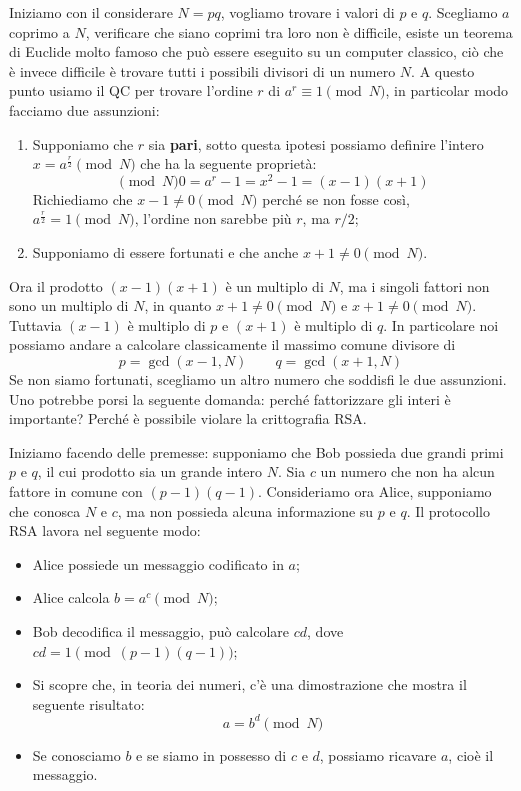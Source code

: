 \noindent Iniziamo con il considerare $N=pq$, vogliamo trovare i valori di $p$ e $q$. Scegliamo $a$ coprimo a $N$, verificare che siano coprimi tra loro non è difficile, esiste un teorema di Euclide molto famoso che può essere eseguito su un computer classico, ciò che è invece difficile è trovare tutti i possibili divisori di un numero $N$. A questo punto usiamo il QC per trovare l'ordine $r$ di $a^r\equiv1 \pmod N$, in particolar modo facciamo due assunzioni:
\begin{enumerate}
    \item Supponiamo che $r$ sia \textbf{pari}, sotto questa ipotesi possiamo definire l'intero $x=a^{\frac r2}\pmod N$ che ha la seguente proprietà:
        \begin{equation*}
            \pmod N 0 =a^r-1 = x^2-1=(x-1)(x+1)
        \end{equation*}
        Richiediamo che $x-1\neq 0\pmod N$ perché se non fosse così, $a^\frac r2 =1 \pmod N$, l'ordine non sarebbe più $r$, ma $r/2$;
    \item Supponiamo di essere fortunati e che anche $x+1\neq 0 \pmod N$.
\end{enumerate}
Ora il prodotto $(x-1)(x+1)$ è un multiplo di $N$, ma i singoli fattori non sono un multiplo di $N$, in quanto $x+1\neq 0 \pmod N$ e $x+1\neq 0 \pmod N$. Tuttavia $(x-1)$ è multiplo di $p$ e $(x+1)$ è multiplo di $q$. In particolare noi possiamo andare a calcolare classicamente il massimo comune divisore di
\begin{equation*}
    p=\gcd{(x-1,N)} \qquad q=\gcd{(x+1,N)}
\end{equation*}
Se non siamo fortunati, scegliamo un altro numero che soddisfi le due assunzioni. \newline
Uno potrebbe porsi la seguente domanda: perché fattorizzare gli interi è importante? Perché è possibile violare la crittografia RSA.
\begin{esempio}
    Iniziamo facendo delle premesse: supponiamo che Bob possieda due grandi primi $p$ e $q$, il cui prodotto sia un grande intero $N$. Sia $c$ un numero che non ha alcun fattore in comune con $(p-1)(q-1)$. Consideriamo ora Alice, supponiamo che conosca $N$ e $c$, ma non possieda alcuna informazione su $p$ e $q$. \newline 
    Il protocollo RSA lavora nel seguente modo:
    \begin{itemize}
        \item Alice possiede un messaggio codificato in $a$;
        \item Alice calcola $b=a^c\pmod N$;
        \item Bob decodifica il messaggio, può calcolare $cd$, dove $cd=1 \pmod{(p-1)(q-1)}$;
        \item Si scopre che, in teoria dei numeri, c'è una dimostrazione che mostra il seguente risultato:
            \begin{equation*}
                a=b^d\pmod N
            \end{equation*}
        \item Se conosciamo $b$ e se siamo in possesso di $c$ e $d$, possiamo ricavare $a$, cioè il messaggio. 
    \end{itemize}
\end{esempio}
